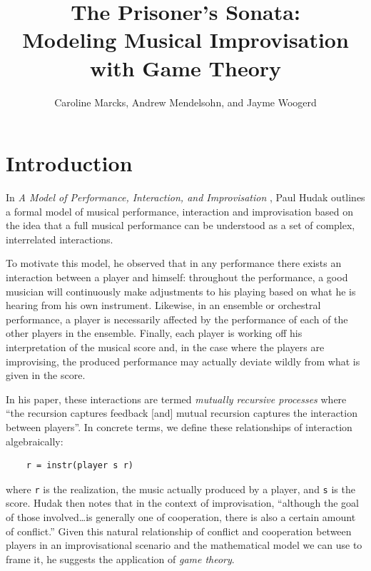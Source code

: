 \documentclass{article}
\begin{document}
\title{The Prisoner's Sonata: \\ \large Modeling Musical Improvisation with Game Theory}
\date{}
\author{Caroline Marcks, Andrew Mendelsohn, and Jayme Woogerd}
\maketitle


\section{Introduction}

In \emph{A Model of Performance, Interaction, and Improvisation} \cite{hudakberger95}, Paul
Hudak outlines a formal model of musical performance, interaction and
improvisation based on the idea that a full musical performance can be
understood as a set of complex, interrelated interactions.

To motivate this model, he observed that in any performance there exists
an interaction between a player and himself: throughout the performance,
a good musician will continuously make adjustments to his playing based
on what he is hearing from his own instrument. Likewise, in an ensemble
or orchestral performance, a player is necessarily affected by the
performance of each of the other players in the ensemble. Finally, each
player is working off his interpretation of the musical score
and, in the case where the players are improvising, the produced
performance may actually deviate wildly from what is given in the score.

In his paper, these interactions are termed \emph{mutually recursive
processes} where ``the recursion captures feedback {[}and{]} mutual
recursion captures the interaction between players''. In
concrete terms, we define these relationships of interaction
algebraically:

\begin{verbatim}
    r = instr(player s r)
\end{verbatim}


where \texttt{r} is the realization, the music actually produced by a
player, and \texttt{s} is the score. Hudak then notes that in the
context of improvisation, ``although the goal of those involved\ldots{}is generally one of cooperation, there is also a certain amount of
conflict.'' Given this natural relationship of conflict and cooperation
between players in an improvisational scenario and the mathematical
model we can use to frame it, he suggests the application of \emph{game
theory}.
\end{document}
